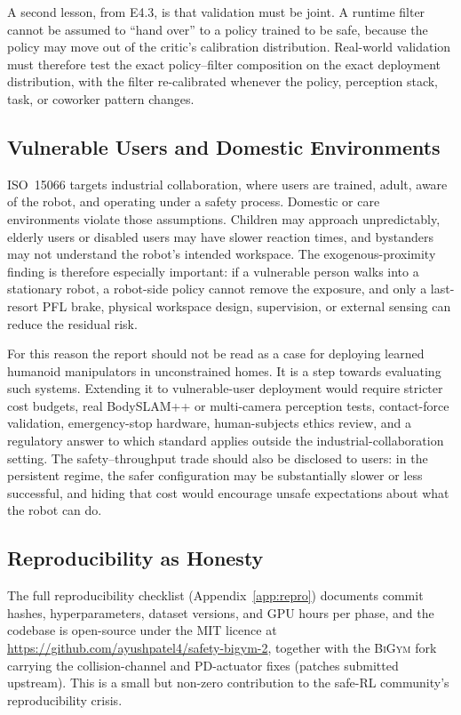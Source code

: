 \documentclass[11pt,a4paper]{report}
\newcommand{\pfl}{PFL}
\newcommand{\iso}{ISO~15066}
\newcommand{\bigym}{\textsc{BiGym}}
\begin{document}
A second lesson, from E4.3, is that validation must be joint. A runtime
filter cannot be assumed to ``hand over'' to a policy trained to be
safe, because the policy may move out of the critic's calibration
distribution. Real-world validation must therefore test the exact
policy--filter composition on the exact deployment distribution, with
the filter re-calibrated whenever the policy, perception stack, task,
or coworker pattern changes.

\subsection{Vulnerable Users and Domestic Environments}

\iso{} targets industrial collaboration, where users are trained,
adult, aware of the robot, and operating under a safety process.
Domestic or care environments violate those assumptions. Children may
approach unpredictably, elderly users or disabled users may have slower
reaction times, and bystanders may not understand the robot's intended
workspace. The exogenous-proximity finding is therefore especially
important: if a vulnerable person walks into a stationary robot, a
robot-side policy cannot remove the exposure, and only a last-resort
\pfl{} brake, physical workspace design, supervision, or external
sensing can reduce the residual risk.

For this reason the report should not be read as a case for deploying
learned humanoid manipulators in unconstrained homes. It is a step
towards evaluating such systems. Extending it to vulnerable-user
deployment would require stricter cost budgets, real BodySLAM++ or
multi-camera perception tests, contact-force validation, emergency-stop
hardware, human-subjects ethics review, and a regulatory answer to
which standard applies outside the industrial-collaboration setting.
The safety--throughput trade should also be disclosed to users: in the
persistent regime, the safer configuration may be substantially slower
or less successful, and hiding that cost would encourage unsafe
expectations about what the robot can do.

\subsection{Reproducibility as Honesty}

The full reproducibility checklist (Appendix~\ref{app:repro})
documents commit hashes, hyperparameters, dataset versions, and GPU
hours per phase, and the codebase is open-source under the MIT
licence at \url{https://github.com/ayushpatel4/safety-bigym-2},
together with the \bigym{} fork carrying the collision-channel and
PD-actuator fixes (patches submitted upstream). This is a small but
non-zero contribution to the safe-RL community's reproducibility
crisis.
\end{document}
